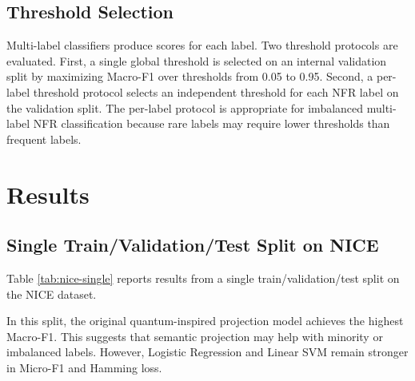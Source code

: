 \documentclass[conference]{IEEEtran}
\begin{document}
\subsection{Threshold Selection}
Multi-label classifiers produce scores for each label. Two threshold protocols are evaluated. First, a single global threshold is selected on an internal validation split by maximizing Macro-F1 over thresholds from 0.05 to 0.95. Second, a per-label threshold protocol selects an independent threshold for each NFR label on the validation split. The per-label protocol is appropriate for imbalanced multi-label NFR classification because rare labels may require lower thresholds than frequent labels.

\section{Results}
\subsection{Single Train/Validation/Test Split on NICE}
Table \ref{tab:nice-single} reports results from a single train/validation/test split on the NICE dataset.

\begin{table}[htbp]
\centering
\caption{NICE multi-label results on a single split}
\label{tab:nice-single}
\end{table}

In this split, the original quantum-inspired projection model achieves the highest Macro-F1. This suggests that semantic projection may help with minority or imbalanced labels. However, Logistic Regression and Linear SVM remain stronger in Micro-F1 and Hamming loss.
\end{document}
